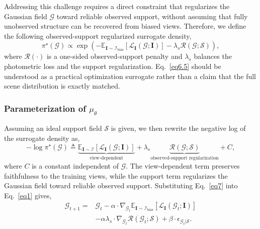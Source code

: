 \documentclass[lettersize,journal]{IEEEtran}
\begin{document}
Addressing this challenge requires a direct constraint that regularizes the Gaussian field $\mathcal{G}$ toward reliable observed support, without assuming that fully unobserved structure can be recovered from biased views.
Therefore, we define the following observed-support regularized surrogate density,
\begin{equation}
    \pi^{\star} (\mathcal{G}) \propto \exp \left( - \mathbb{E}_{\mathbf{I}\sim\mathcal{I}_{\text{bias}}}\!\left[\mathcal{L}_{\mathbf{I}}(\mathcal{G};\mathbf{I})\right] - \lambda_{s} \mathcal{R}(\mathcal{G};\mathcal{S}) \right),
    \label{eq6.5}
\end{equation}
where $\mathcal{R}(\cdot)$ is a one-sided observed-support penalty and $\lambda_{s}$ balances the photometric loss and the support regularization. Eq.~\ref{eq6.5} should be understood as a practical optimization surrogate rather than a claim that the full scene distribution is exactly matched.

\subsubsection{Parameterization of \texorpdfstring{$\mu_{\theta}$}{mu-theta}}

Assuming an ideal support field $\mathcal{S}$ is given, we then rewrite the negative log of the surrogate density as, 
\begin{equation}
    -\log \pi^{\star} (\mathcal{G}) \triangleq \underbrace{\mathbb{E}_{\mathbf{I}\sim\mathcal{I}}\!\left[\mathcal{L}_{\mathbf{I}}(\mathcal{G};\mathbf{I})\right]}_{\text{view-dependent}}
    + \lambda_{s} \underbrace{\mathcal{R}(\mathcal{G};\mathcal{S})}_{\text{observed-support regularization}} + C,
    \label{eq7}
\end{equation}
where $C$ is a constant independent of $\mathcal{G}$. The view-dependent term preserves faithfulness to the training views, while the support term regularizes the Gaussian field toward reliable observed support. Substituting Eq.~\ref{eq7} into Eq.~\ref{eq1} gives, 
\begin{equation}
    \begin{aligned}
    \mathcal{G}_{t+1} = &\mathcal{G}_t - \alpha \cdot \nabla_{\mathcal{G}_t} \mathbb{E}_{\mathbf{I}\sim\mathcal{I}_{\text{bias}}}\!\left[\mathcal{L}_{\mathbf{I}}(\mathcal{G}_t;\mathbf{I})\right] \\
    &- \alpha \lambda_s \cdot \nabla_{\mathcal{G}_t} \mathcal{R}(\mathcal{G}_t;\mathcal{S}) + \beta \cdot \epsilon_{\mathcal{G}_t \vert \mathcal{S}}.
    \end{aligned}
    \label{eq8}
\end{equation} 
\end{document}
